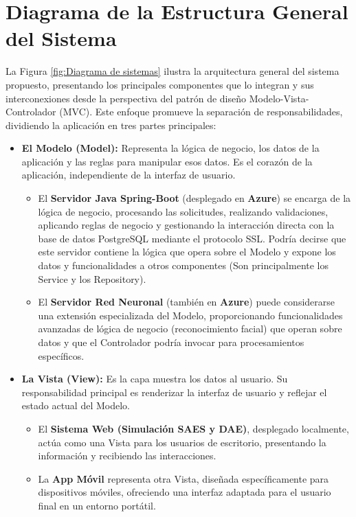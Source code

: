 \section{Diagrama de la Estructura General del Sistema} 
La Figura \ref{fig:Diagrama de sistemas} ilustra la arquitectura general del sistema propuesto, presentando los principales componentes que lo integran y sus interconexiones desde la perspectiva del patrón de diseño Modelo-Vista-Controlador (MVC). Este enfoque promueve la separación de responsabilidades, dividiendo la aplicación en tres partes principales:

\begin{itemize}
	\item \textbf{El Modelo (Model):} Representa la lógica de negocio, los datos de la aplicación y las reglas para manipular esos datos. Es el corazón de la aplicación, independiente de la interfaz de usuario.
	\begin{itemize}
		\item El \textbf{Servidor Java Spring-Boot} (desplegado en \textbf{Azure}) se encarga de la lógica de negocio, procesando las solicitudes, realizando validaciones, aplicando reglas de negocio y gestionando la interacción directa con la base de datos PostgreSQL mediante el protocolo SSL. Podría decirse que este servidor contiene la lógica que opera sobre el Modelo y expone los datos y funcionalidades a otros componentes (Son principalmente los Service y los Repository).
		\item El \textbf{Servidor Red Neuronal} (también en \textbf{Azure}) puede considerarse una extensión especializada del Modelo, proporcionando funcionalidades avanzadas de lógica de negocio (reconocimiento facial) que operan sobre datos y que el Controlador podría invocar para procesamientos específicos.
	\end{itemize}
	
	\item \textbf{La Vista (View):} Es la capa muestra los datos al usuario. Su responsabilidad principal es renderizar la interfaz de usuario y reflejar el estado actual del Modelo.
	\begin{itemize}
		\item El \textbf{Sistema Web (Simulación SAES y DAE)}, desplegado localmente, actúa como una Vista para los usuarios de escritorio, presentando la información y recibiendo las interacciones.
		\item La \textbf{App Móvil} representa otra Vista, diseñada específicamente para dispositivos móviles, ofreciendo una interfaz adaptada para el usuario final en un entorno portátil.
	\end{itemize}
	

\end{itemize}
